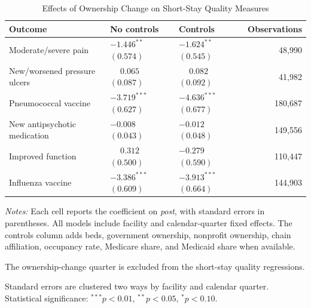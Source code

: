 \documentclass[12pt]{article}
\begin{document}
\vspace{1em}


\begin{table}[H]
\centering
\begin{threeparttable}
\caption{Effects of Ownership Change on Short-Stay Quality Measures}
\label{tab:short-stay-quality-checks}
\small
\setlength{\tabcolsep}{6pt}
\begin{tabularx}{\textwidth}{@{} l Y Y r @{}}
\toprule
Outcome & No controls & Controls & Observations \\
\midrule
Moderate/severe pain &  &  & 48,990 \\
New/worsened pressure ulcers &  &  & 41,982 \\
Pneumococcal vaccine &  &  & 180,687 \\
New antipsychotic medication &  &  & 149,556 \\
Improved function &  &  & 110,447 \\
Influenza vaccine &  &  & 144,903 \\
\bottomrule
\end{tabularx}

\begin{tablenotes}[flushleft]
\footnotesize
\item \textit{Notes:} Each cell reports the coefficient on \textit{post}, with standard errors in parentheses. All models include facility and calendar-quarter fixed effects. The controls column adds beds, government ownership, nonprofit ownership, chain affiliation, occupancy rate, Medicare share, and Medicaid share when available.
\item The ownership-change quarter is excluded from the short-stay quality regressions.
\item Standard errors are clustered two ways by facility and calendar quarter. Statistical significance: $^{***}p<0.01$, $^{**}p<0.05$, $^{*}p<0.10$.
\end{tablenotes}
\end{threeparttable}
\end{table}
\end{document}
